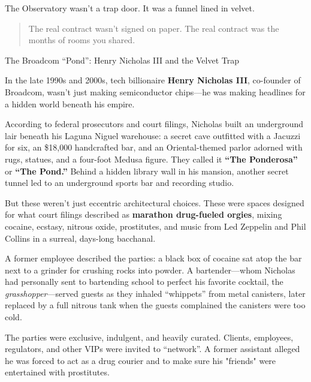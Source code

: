 The Observatory wasn’t a trap door.  It was a funnel lined in velvet.

\begin{quote}
The real contract wasn’t signed on paper.  The real contract was the months of rooms you shared.
\end{quote}


\medskip


\begin{HistoricalSidebar}{The Broadcom ``Pond'': Henry Nicholas III and the Velvet Trap}

  In the late 1990s and 2000s, tech billionaire \textbf{Henry Nicholas III}, co-founder of Broadcom, wasn’t just making semiconductor chips—he was making headlines for a hidden world beneath his empire.

  \medskip
  
  According to federal prosecutors and court filings, Nicholas built an underground lair beneath his Laguna Niguel warehouse: a secret cave outfitted with a Jacuzzi for six, an \$18{,}000 handcrafted bar, and an Oriental-themed parlor adorned with rugs, statues, and a four-foot Medusa figure. They called it \textbf{“The Ponderosa”} or \textbf{“The Pond.”} Behind a hidden library wall in his mansion, another secret tunnel led to an underground sports bar and recording studio.

  \medskip
  
  But these weren’t just eccentric architectural choices. These were spaces designed for what court filings described as \textbf{marathon drug-fueled orgies}, mixing cocaine, ecstasy, nitrous oxide, prostitutes, and music from Led Zeppelin and Phil Collins in a surreal, days-long bacchanal.

  \medskip
  
  A former employee described the parties: a black box of cocaine sat atop the bar next to a grinder for crushing rocks into powder. A bartender—whom Nicholas had personally sent to bartending school to perfect his favorite cocktail, the \emph{grasshopper}—served guests as they inhaled “whippets” from metal canisters, later replaced by a full nitrous tank when the guests complained the canisters were too cold.

  \medskip
  
  The parties were exclusive, indulgent, and heavily curated. Clients, employees, regulators, and other VIPs were invited to ``network''. A former assistant alleged he was forced to act as a drug courier and to make sure his "friends" were entertained with prostitutes.


\end{HistoricalSidebar}
